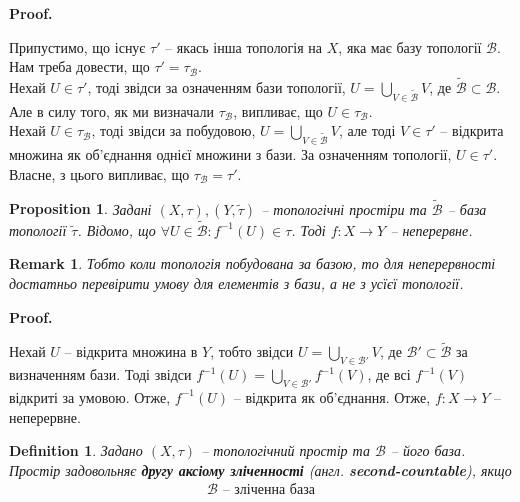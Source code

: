 \documentclass[a4paper, 10pt]{article}
\makeatletter
\theoremstyle{theoremdd}
\newtheorem{definition}[theorem]{Definition}
\newtheorem{proposition}[theorem]{Proposition}
\newtheorem{remark}[theorem]{Remark}
\renewenvironment{proof}[1][Proof.\\]{\par
\pushQED{\hfill \qed}%
\normalfont \topsep6\p@\@plus6\p@\relax
\trivlist
\item\relax
{\bfseries
#1\@addpunct{.}}\hspace\labelsep\ignorespaces
}{%
\popQED\endtrivlist\@endpefalse
}
\makeatother
\begin{document}
\begin{proof}
Припустимо, що існує $\tau'$ -- якась інша топологія на $X$, яка має базу топології $\mathcal{B}$. Нам треба довести, що $\tau' = \tau_{\mathcal{B}}$.\\
Нехай $U \in \tau'$, тоді звідси за означенням бази топології, $U = \displaystyle\bigcup_{V \in \mathcal{\tilde{B}}} V$, де $\mathcal{\tilde{B}} \subset \mathcal{B}$. Але в силу того, як ми визначали $\tau_{\mathcal{B}}$, випливає, що $U \in \tau_{\mathcal{B}}$.\\
Нехай $U \in \tau_{\mathcal{B}}$, тоді звідси за побудовою, $U = \displaystyle\bigcup_{V \in \mathcal{\tilde{B}}} V$, але тоді $V \in \tau'$ -- відкрита множина як об'єднання однієї множини з бази. За означенням топології, $U \in \tau'$.\\
Власне, з цього випливає, що $\tau_{\mathcal{B}} = \tau'$.
\end{proof}

\begin{proposition}
Задані $(X,\tau), (Y,\tilde{\tau})$ -- топологічні простіри та $\tilde{\mathcal{B}}$ -- база топології $\tilde{\tau}$. Відомо, що $\forall U \in \tilde{\mathcal{B}}: f^{-1}(U) \in \tau$. Тоді $f \colon X \to Y$ -- неперервне.
\end{proposition}

\begin{remark}
Тобто коли топологія побудована за базою, то для неперервності достатньо перевірити умову для елементів з бази, а не з усїєї топології.
\end{remark}

\begin{proof}
Нехай $U$ -- відкрита множина в $Y$, тобто звідси $U = \displaystyle\bigcup_{V \in \mathcal{B}'} V$, де $\mathcal{B}' \subset \tilde{\mathcal{B}}$ за визначенням бази. Тоді звідси $f^{-1}(U) = \displaystyle\bigcup_{V \in \mathcal{B}'} f^{-1}(V)$, де всі $f^{-1}(V)$ відкриті за умовою. Отже, $f^{-1}(U)$ -- відкрита як об'єднання. Отже, $f \colon X \to Y$ -- неперервне.
\end{proof}

\begin{definition}
Задано $(X,\tau)$ -- топологічний простір та $\mathcal{B}$ -- його база.\\
Простір задовольняє \textbf{другу аксіому зліченності} (англ. \textbf{second-countable}), якщо
\begin{align*}
\mathcal{B} \text{ -- зліченна база}
\end{align*}
\end{definition}
\end{document}

